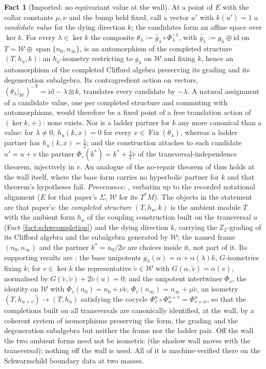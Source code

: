 \documentclass[11pt]{article}
\theoremstyle{definition}
\newtheorem{fact}[theorem]{Fact}
\newcommand{\id}{\mathrm{id}}
\newcommand{\nO}{n_0}
\newcommand{\nInf}{n_\infty}
\newcommand{\shW}{\mathcal{W}}
\begin{document}
\begin{fact}[Imported: no equivariant value at the wall]\label{fact:novalue}
At a point of $E$ with the collar constants $\mu, \nu$ and the bump held fixed, call a vector $u'$ with $k(u') = 1$ a \emph{candidate value} for the dying direction $k$; the candidates form an affine space over $\ker k$. For every $\lambda \in \ker k$ the composite $\theta_\lambda := \hat g_\lambda \circ \Phi_\lambda^{-1}$, with $\hat g_\lambda := g_\lambda \oplus \id$ on $T = \shW \oplus \operatorname{span}\{\nO, \nInf\}$, is an automorphism of the completed structure $(T, h_u, k)$: an $h_u$-isometry restricting to $g_\lambda$ on $\shW$ and fixing $k$, hence an automorphism of the completed Clifford algebra preserving its grading and its degeneration subalgebra. Its contragredient action on vectors, $(\theta_\lambda|_{\shW})^{-\mathsf{T}} = \id - \lambda \otimes k$, translates every candidate by $-\lambda$. A natural assignment of a candidate value, one per completed structure and commuting with automorphisms, would therefore be a fixed point of a free translation action of $(\ker k, +)$: none exists. Nor is a ladder partner for $k$ any more canonical than a value: for $\lambda \neq 0$, $h_u(k, x) = 0$ for every $x \in \operatorname{Fix}(\theta_\lambda)$, whereas a ladder partner has $h_u(k, x) = \tfrac12$; and the construction attaches to each candidate $u' = u + v$ the partner $\Phi_v(k^*) = k^* + \tfrac12\tilde v$ of the transversal-independence theorem, injectively in $v$. An analogue of the no-repair theorem of \cite[Thm.~4.2]{ButlerT1} thus holds at the wall itself, where the base form carries no hyperbolic partner for $k$ and that theorem's hypotheses fail.
\emph{Provenance:} \cite[Thm.~10.4]{ButlerT4}, verbatim up to the recorded notational alignment ($E$ for that paper's $\Sigma$, $\shW$ for its $T^*M$). The objects in the statement are that paper's: the \emph{completed structure} $(T, h_u, k)$ is the ambient module $T$ with the ambient form $h_u$ of the coupling construction built on the transversal $u$ (Fact \ref{fact:schwcompletion}) and the dying direction $k$, carrying the $\mathbb{Z}_2$-grading of its Clifford algebra and the subalgebra generated by $\shW$; the named frame $(\nO, \nInf)$ and the partner $k^* = \nO/2\nu$ are choices inside it, not part of it. Its supporting results are \cite[Lems 10.1, 10.2, Thm.~10.3]{ButlerT4}: the base unipotents $g_\lambda(\alpha) = \alpha + \alpha(\lambda)k$, $G$-isometries fixing $k$; for $v \in \ker k$ the representative $\tilde v \in \shW$ with $G(\alpha, \tilde v) = \alpha(v)$, normalised by $G(\tilde v, \tilde v) + 2\tilde v(u) = 0$; and the unipotent intertwiner $\Phi_v$, the identity on $\shW$ with $\Phi_v(\nO) = \nO + \nu\tilde v$, $\Phi_v(\nInf) = \nInf + \mu\tilde v$, an isometry $(T, h_{u+v}) \to (T, h_u)$ satisfying the cocycle $\Phi^u_v \circ \Phi^{u+v}_w = \Phi^u_{v+w}$, so that the completions built on all transversals are canonically identified, at the wall, by a coherent system of isomorphisms preserving the form, the grading and the degeneration subalgebra but neither the frame nor the ladder pair. Off the wall the two ambient forms need not be isometric (the shadow wall moves with the transversal); nothing off the wall is used. All of it is machine-verified there on the Schwarzschild boundary data at two masses.

\end{fact}
\end{document}
